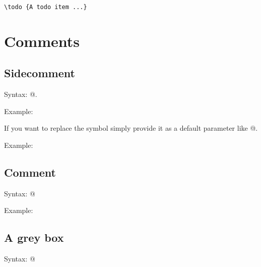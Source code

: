 \documentclass[a4paper,12pt]{article}
\begin{document}

\begin{verbatim}
\todo {A todo item ...}
\end{verbatim}


\section{Comments}

\subsection {Sidecomment}

Syntax: \verb@{}@.

Example:  

If you want to replace the symbol simply provide it as a default parameter like \verb@{}@.

Example: 


\subsection{Comment}

Syntax: \verb@{}@

Example:

\subsection{A grey box}

Syntax: \verb@{}@
\end{document}
